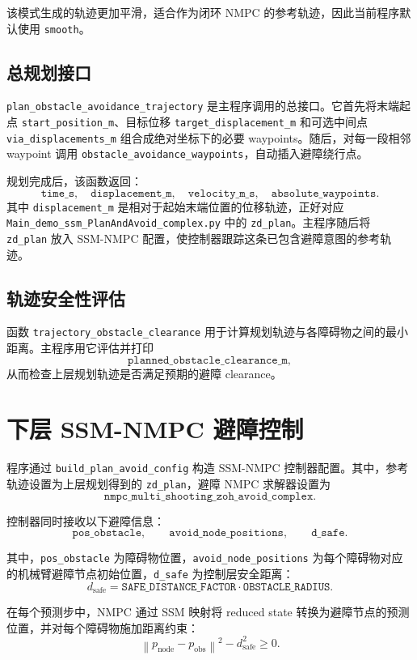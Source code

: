 \documentclass[11pt]{article}
\begin{document}
该模式生成的轨迹更加平滑，适合作为闭环 NMPC 的参考轨迹，因此当前程序默认使用 \texttt{smooth}。

\subsection{总规划接口}

\texttt{plan\_obstacle\_avoidance\_trajectory} 是主程序调用的总接口。它首先将末端起点 \texttt{start\_position\_m}、目标位移 \texttt{target\_displacement\_m} 和可选中间点 \texttt{via\_displacements\_m} 组合成绝对坐标下的必要 waypoints。随后，对每一段相邻 waypoint 调用 \texttt{obstacle\_avoidance\_waypoints}，自动插入避障绕行点。

规划完成后，该函数返回：
\[
\texttt{time\_s},\quad
\texttt{displacement\_m},\quad
\texttt{velocity\_m\_s},\quad
\texttt{absolute\_waypoints}.
\]
其中 \texttt{displacement\_m} 是相对于起始末端位置的位移轨迹，正好对应 \texttt{Main\_demo\_ssm\_PlanAndAvoid\_complex.py} 中的 \texttt{zd\_plan}。主程序随后将 \texttt{zd\_plan} 放入 SSM-NMPC 配置，使控制器跟踪这条已包含避障意图的参考轨迹。

\subsection{轨迹安全性评估}

函数 \texttt{trajectory\_obstacle\_clearance} 用于计算规划轨迹与各障碍物之间的最小距离。主程序用它评估并打印
\[
\texttt{planned\_obstacle\_clearance\_m},
\]
从而检查上层规划轨迹是否满足预期的避障 clearance。

\section{下层 SSM-NMPC 避障控制}

程序通过 \texttt{build\_plan\_avoid\_config} 构造 SSM-NMPC 控制器配置。其中，参考轨迹设置为上层规划得到的 \texttt{zd\_plan}，避障 NMPC 求解器设置为
\[
\texttt{nmpc\_multi\_shooting\_zoh\_avoid\_complex}.
\]

控制器同时接收以下避障信息：
\[
\texttt{pos\_obstacle}, \qquad
\texttt{avoid\_node\_positions}, \qquad
\texttt{d\_safe}.
\]

其中，\texttt{pos\_obstacle} 为障碍物位置，\texttt{avoid\_node\_positions} 为每个障碍物对应的机械臂避障节点初始位置，\texttt{d\_safe} 为控制层安全距离：
\[
d_{\mathrm{safe}} = \texttt{SAFE\_DISTANCE\_FACTOR} \cdot \texttt{OBSTACLE\_RADIUS}.
\]

在每个预测步中，NMPC 通过 SSM 映射将 reduced state 转换为避障节点的预测位置，并对每个障碍物施加距离约束：
\[
\left\|p_{\mathrm{node}} - p_{\mathrm{obs}}\right\|^2 - d_{\mathrm{safe}}^2 \geq 0.
\]
\end{document}
